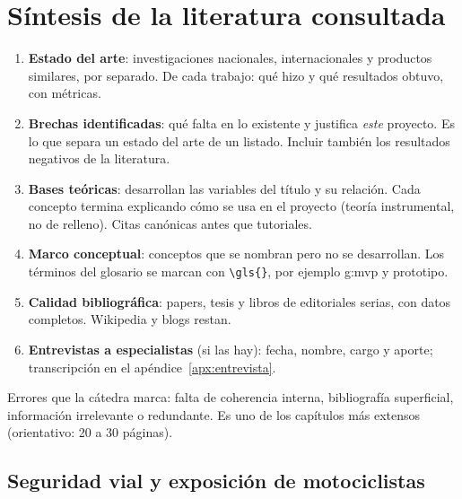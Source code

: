 
\chapter{Síntesis de la literatura consultada}\label{cap:marco-teorico}

\begin{guia}
\begin{enumerate}
    \item \textbf{Estado del arte}: investigaciones nacionales,
          internacionales y productos similares, por separado. De cada
          trabajo: qué hizo y qué resultados obtuvo, con métricas.
    \item \textbf{Brechas identificadas}: qué falta en lo existente y
          justifica \emph{este} proyecto. Es lo que separa un estado del
          arte de un listado. Incluir también los resultados negativos de
          la literatura.
    \item \textbf{Bases teóricas}: desarrollan las variables del título y su
          relación. Cada concepto termina explicando cómo se usa en el
          proyecto (teoría instrumental, no de relleno). Citas canónicas
          antes que tutoriales.
    \item \textbf{Marco conceptual}: conceptos que se nombran pero no se
          desarrollan. Los términos del glosario se marcan con
          \verb|\gls{}|, por ejemplo \gls{g:mvp} y \gls{prototipo}.
    \item \textbf{Calidad bibliográfica}: papers, tesis y libros de
          editoriales serias, con datos completos. Wikipedia y blogs restan.
    \item \textbf{Entrevistas a especialistas} (si las hay): fecha, nombre,
          cargo y aporte; transcripción en el apéndice~\ref{apx:entrevista}.
\end{enumerate}
Errores que la cátedra marca: falta de coherencia interna, bibliografía
superficial, información irrelevante o redundante. Es uno de los
capítulos más extensos (orientativo: 20 a 30 páginas).
\end{guia}

\section{Seguridad vial y exposición de motociclistas}

